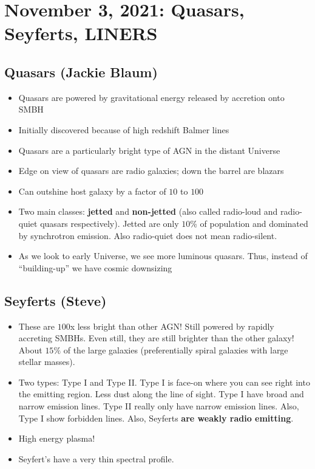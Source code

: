 \documentclass{article}
\begin{document}
\section{November 3, 2021: Quasars, Seyferts, LINERS}

\subsection{Quasars (Jackie Blaum)}

\begin{itemize}
    \item Quasars are powered by gravitational energy released by accretion onto SMBH
    \item Initially discovered because of high redshift Balmer lines
    \item Quasars are a particularly bright type of AGN in the distant Universe
    \item Edge on view of quasars are radio galaxies; down the barrel are blazars
    \item Can outshine host galaxy by a factor of $10$ to $100$
    \item Two main classes: \textbf{jetted} and \textbf{non-jetted} (also called radio-loud and radio-quiet quasars respectively). Jetted are only $10$\% of population and dominated by synchrotron emission. Also radio-quiet does not mean radio-silent.
    \item As we look to early Universe, we see more luminous quasars. Thus, instead of ``building-up'' we have cosmic downsizing
\end{itemize}

\subsection{Seyferts (Steve)}

\begin{itemize}
    \item These are $100$x less bright than other AGN! Still powered by rapidly accreting SMBHs. Even still, they are still brighter than the other galaxy! About $15\%$ of the large galaxies (preferentially spiral galaxies with large stellar masses).
    \item Two types: Type I and Type II. Type I is face-on where you can see right into the emitting region. Less dust along the line of sight. Type I have broad and narrow emission lines. Type II really only have narrow emission lines. Also, Type I show forbidden lines. Also, Seyferts \textbf{are weakly radio emitting}.
    \item High energy plasma! 
    \item Seyfert's have a very thin spectral profile. 
\end{itemize}
\end{document}

